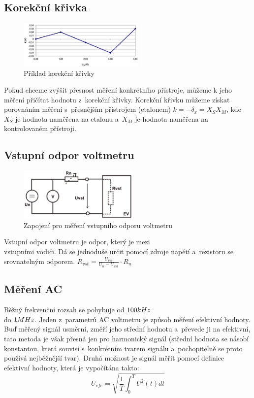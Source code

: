 \documentclass{article}
\begin{document}
\newpage
\subsection*{Korekční křivka}
\begin{figure}
    \includegraphics[width=0.55\textwidth]{obrazky/korekcni_krivka.png}
    \caption{\label{korek_krivka}Příklad korekční křivky}
\end{figure}
Pokud chceme zvýšit přesnost měření konkrétního přístroje, můžeme k jeho měření přičítat hodnotu z~korekční křivky.
Korekční křivku můžeme získat porovnáním měření s~přesnějším přístrojem (etalonem) \(k = -\delta_x = X_S X_M\), kde \(X_S\) je hodnota naměřena na etalonu a~\(X_M\) je hodnota naměřena na kontrolovaném přístroji.

\subsection*{Vstupní odpor voltmetru}
\begin{figure}
    \vspace{-10mm}
    \includegraphics[width=0.52\textwidth]{obrazky/vstup_odpor.png}
    \caption{\label{vstupni_odpor}Zapojení pro měření vstupního odporu voltmetru}
\end{figure}
Vstupní odpor voltmetru je odpor, který je mezi \\vstupními vodiči.
Dá se jednoduše určit pomocí zdroje napětí a~rezistoru se srovnatelným odporem.
\(R_{vst}=\frac{U_{vst}}{U_{n}-U_{vst}}\cdot R_n\)

\subsection{Měření AC}
Běžný frekvenční rozsah se pohybuje od \(100\-kHz\) \\do \(1\-MHz\).
Jeden z~parametrů AC voltmetru je způsob měření efektivní hodnoty.
Buď měřený signál usměrní, změří jeho střední hodnotu a~převede ji na efektivní, tato metoda je však přesná jen pro harmonický signál (střední hodnota se násobí konstantou, která souvisí s~konkrétním tvarem signálu a~pochopitelně se proto používá nejběžnější tvar).
Druhá možnost je signál měřit pomocí definice efektivní hodnoty, která je vypočítána takto:
\begin{equation}
    U_{efe} = \sqrt{\frac{1}{T}\int_{0}^{T}U^2(t)dt}
    \label{proud_kolektoru}
\end{equation}
\end{document}
